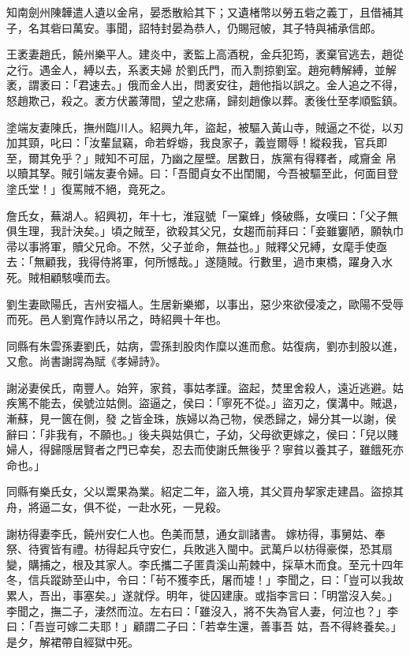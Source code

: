 \begin{pinyinscope}
 知南劍州陳韡遣人遺以金帛，晏悉散給其下；又遺楮幣以勞五砦之義丁，且借補其子，名其砦曰萬安。事聞，詔特封晏為恭人，仍賜冠帔，其子特與補承信郎。



 王袤妻趙氏，饒州樂平人。建炎中，袤監上高酒稅，金兵犯筠，袤棄官逃去，趙從之行。遇金人，縛以去，系袤夫婦
 於劉氏門，而入剽掠劉室。趙宛轉解縛，並解袤，謂袤曰：「君速去。」俄而金人出，問袤安往，趙他指以誤之。金人追之不得，怒趙欺己，殺之。袤方伏叢薄間，望之悲痛，歸刻趙像以葬。袤後仕至孝順監鎮。



 塗端友妻陳氏，撫州臨川人。紹興九年，盜起，被驅入黃山寺，賊逼之不從，以刃加其頸，叱曰：「汝輩鼠竊，命若蜉蝣，我良家子，義豈爾辱！縱殺我，官兵即至，爾其免乎？」賊知不可屈，乃幽之屋壁。居數日，族黨有得釋者，咸齎金
 帛以贖其孥。賊引端友妻令婦。曰：「吾聞貞女不出閨閣，今吾被驅至此，何面目登塗氏堂！」復罵賊不絕，竟死之。



 詹氏女，蕪湖人。紹興初，年十七，淮寇號「一窠蜂」倏破縣，女嘆曰：「父子無俱生理，我計決矣。」頃之賊至，欲殺其父兄，女趨而前拜曰：「妾雖窶陋，願執巾帚以事將軍，贖父兄命。不然，父子並命，無益也。」賊釋父兄縛，女麾手使亟去：「無顧我，我得侍將軍，何所憾哉。」遂隨賊。行數里，過市東橋，躍身入水死。賊相顧駭嘆而去。



 劉生妻歐陽氏，吉州安福人。生居新樂鄉，以事出，惡少來欲侵凌之，歐陽不受辱而死。邑人劉寬作詩以吊之，時紹興十年也。



 同縣有朱雲孫妻劉氏，姑病，雲孫刲股肉作糜以進而愈。姑復病，劉亦刲股以進，又愈。尚書謝諤為賦《孝婦詩》。



 謝泌妻侯氏，南豐人。始笄，家貧，事姑孝謹。盜起，焚里舍殺人，遠近逃避。姑疾篤不能去，侯號泣姑側。盜逼之，侯曰：「寧死不從。」盜刃之，僕溝中。賊退，漸蘇，見一篋在側，發
 之皆金珠，族婦以為己物，侯悉歸之，婦分其一以謝，侯辭曰：「非我有，不願也。」後夫與姑俱亡，子幼，父母欲更嫁之，侯曰：「兒以賤婦人，得歸隱居賢者之門已幸矣，忍去而使謝氏無後乎？寧貧以養其子，雖餓死亦命也。」



 同縣有樂氏女，父以鬻果為業。紹定二年，盜入境，其父買舟挈家走建昌。盜掠其舟，將逼二女，俱不從，一赴水死，一見殺。



 謝枋得妻李氏，饒州安仁人也。色美而慧，通女訓諸書。
 嫁枋得，事舅姑、奉祭、待賓皆有禮。枋得起兵守安仁，兵敗逃入閩中。武萬戶以枋得豪傑，恐其扇變，購捕之，根及其家人。李氏攜二子匿貴溪山荊棘中，採草木而食。至元十四年冬，信兵蹤跡至山中，令曰：「茍不獲李氏，屠而墟！」李聞之，曰：「豈可以我故累人，吾出，事塞矣。」遂就俘。明年，徙囚建康。或指李言曰：「明當沒入矣。」李聞之，撫二子，淒然而泣。左右曰：「雖沒入，將不失為官人妻，何泣也？」李曰：「吾豈可嫁二夫耶！」顧謂二子曰：「若幸生還，善事吾
 姑，吾不得終養矣。」是夕，解裙帶自經獄中死。




\end{pinyinscope}
